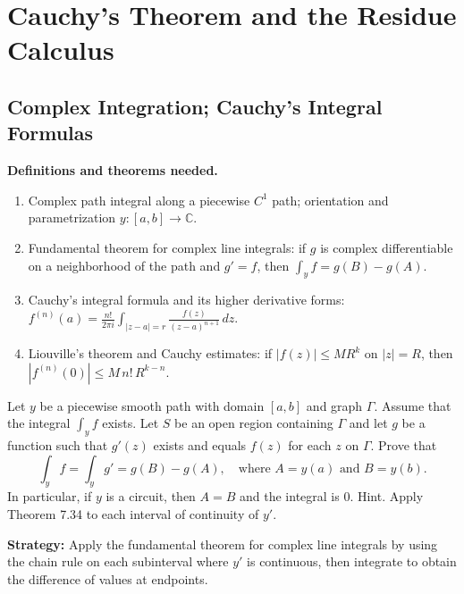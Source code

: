 \chapter{Cauchy's Theorem and the Residue Calculus}
\section{Complex Integration; Cauchy's Integral Formulas}

\noindent\textbf{Definitions and theorems needed.}
\begin{enumerate}[label=(\alph*)]
\item Complex path integral along a piecewise $C^1$ path; orientation and parametrization $y:[a,b]\to\mathbb C$.
\item Fundamental theorem for complex line integrals: if $g$ is complex differentiable on a neighborhood of the path and $g'=f$, then $\int_y f= g(B)-g(A)$.
\item Cauchy's integral formula and its higher derivative forms: $f^{(n)}(a)=\frac{n!}{2\pi i}\int_{|z-a|=r} \frac{f(z)}{(z-a)^{n+1}}\,dz$.
\item Liouville's theorem and Cauchy estimates: if $|f(z)|\le M R^k$ on $|z|=R$, then $|f^{(n)}(0)|\le M\, n!\, R^{k-n}$.
\end{enumerate}



\begin{problembox}
\begin{problemstatement}
Let \( y \) be a piecewise smooth path with domain \([a, b]\) and graph \(\Gamma\). Assume that the integral \( \int_y f \) exists. Let \( S \) be an open region containing \(\Gamma\) and let \( g \) be a function such that \( g'(z) \) exists and equals \( f(z) \) for each \( z \) on \(\Gamma\). Prove that
\[\int_y f = \int_y g' = g(B) - g(A), \quad \text{where } A = y(a) \text{ and } B = y(b).\]
In particular, if \( y \) is a circuit, then \( A = B \) and the integral is 0. Hint. Apply Theorem 7.34 to each interval of continuity of \( y' \).
\end{problemstatement}
\end{problembox}

\noindent\textbf{Strategy:} Apply the fundamental theorem for complex line integrals by using the chain rule on each subinterval where \( y' \) is continuous, then integrate to obtain the difference of values at endpoints.

